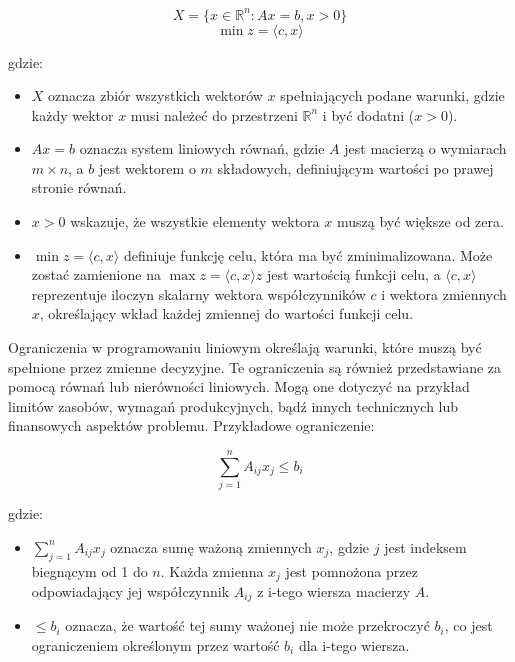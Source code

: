 \[
X = \{ x \in \mathbb{R}^n : Ax = b, x > 0 \}
\]
\[
\min z = \langle c, x \rangle
\]

gdzie:
\begin{itemize}
    \item \( X \) oznacza zbiór wszystkich wektorów \( x \) spełniających podane warunki, gdzie każdy wektor \( x \) musi należeć do przestrzeni \( \mathbb{R}^n \) i być dodatni (\( x > 0 \)).
    \item \( Ax = b \) oznacza system liniowych równań, gdzie \( A \) jest macierzą o wymiarach \( m \times n \), a \( b \) jest wektorem o \( m \) składowych, definiującym wartości po prawej stronie równań.
    \item \( x > 0 \) wskazuje, że wszystkie elementy wektora \( x \) muszą być większe od zera.
    \item \( \min z = \langle c, x \rangle \) definiuje funkcję celu, która ma być zminimalizowana. Może zostać zamienione na \( \max z = \langle c, x \rangle \)\( z \) jest wartością funkcji celu, a \( \langle c, x \rangle \) reprezentuje iloczyn skalarny wektora współczynników \( c \) i wektora zmiennych \( x \), określający wkład każdej zmiennej do wartości funkcji celu.
\end{itemize}

\par Ograniczenia w programowaniu liniowym określają warunki, które muszą być spełnione przez zmienne decyzyjne. Te ograniczenia są również przedstawiane za pomocą równań lub nierówności liniowych. Mogą one dotyczyć na przykład limitów zasobów, wymagań produkcyjnych, bądź innych technicznych lub finansowych aspektów problemu. Przykładowe ograniczenie:

\[
\sum_{j=1}^{n} A_{ij} x_j \leq b_i
\]

gdzie:
\begin{itemize}
    \item \( \sum_{j=1}^{n} A_{ij} x_j \) oznacza sumę ważoną zmiennych \( x_j \), gdzie \( j \) jest indeksem biegnącym od 1 do \( n \). Każda zmienna \( x_j \) jest pomnożona przez odpowiadający jej współczynnik \( A_{ij} \) z i-tego wiersza macierzy \( A \).
    \item \( \leq b_i \) oznacza, że wartość tej sumy ważonej nie może przekroczyć \( b_i \), co jest ograniczeniem określonym przez wartość \( b_i \) dla i-tego wiersza. 
\end{itemize}
    
